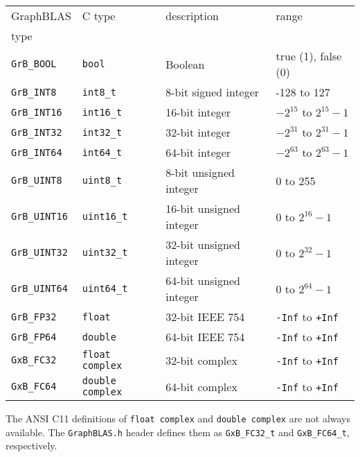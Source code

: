 \documentclass[12pt]{article}
\begin{document}
{\vspace{0.2in}
\noindent
{\footnotesize
\begin{tabular}{llll}
\hline
GraphBLAS         & C type           & description              & range \\
type              &                  &                          & \\
\hline
\verb'GrB_BOOL'   & \verb'bool'      & Boolean                  & true (1), false (0) \\
\hline
\verb'GrB_INT8'   & \verb'int8_t'    & 8-bit signed integer     & -128 to 127 \\
\verb'GrB_INT16'  & \verb'int16_t'   & 16-bit integer           & $-2^{15}$ to $2^{15}-1$ \\
\verb'GrB_INT32'  & \verb'int32_t'   & 32-bit integer           & $-2^{31}$ to $2^{31}-1$ \\
\verb'GrB_INT64'  & \verb'int64_t'   & 64-bit integer           & $-2^{63}$ to $2^{63}-1$ \\
\hline
\verb'GrB_UINT8'  & \verb'uint8_t'   & 8-bit unsigned integer   & 0 to 255 \\
\verb'GrB_UINT16' & \verb'uint16_t'  & 16-bit unsigned integer  & 0 to $2^{16}-1$ \\
\verb'GrB_UINT32' & \verb'uint32_t'  & 32-bit unsigned integer  & 0 to $2^{32}-1$ \\
\verb'GrB_UINT64' & \verb'uint64_t'  & 64-bit unsigned integer  & 0 to $2^{64}-1$ \\
\hline
\verb'GrB_FP32'   & \verb'float'     & 32-bit IEEE 754          & \verb'-Inf' to \verb'+Inf'\\
\verb'GrB_FP64'   & \verb'double'    & 64-bit IEEE 754          & \verb'-Inf' to \verb'+Inf'\\
\hline
\verb'GxB_FC32'   & \verb'float complex'  & 32-bit complex & \verb'-Inf' to \verb'+Inf'\\
\verb'GxB_FC64'   & \verb'double complex' & 64-bit complex & \verb'-Inf' to \verb'+Inf'\\
\hline
\end{tabular}
}
\vspace{0.2in}

The ANSI C11 definitions of \verb'float complex' and \verb'double complex'
are not always available.  The \verb'GraphBLAS.h' header defines them as
\verb'GxB_FC32_t' and \verb'GxB_FC64_t', respectively.

}
\end{document}
